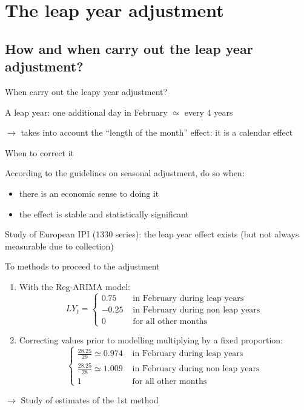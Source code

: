 \documentclass[10pt,xcolor=table,color={dvipsnames,usenames},ignorenonframetext,usepdftitle=false,french]{beamer}
\begin{document}
\section{The leap year adjustment}\label{the-leap-year-adjustment}

\subsection{How and when carry out the leap year
adjustment?}\label{how-and-when-carry-out-the-leap-year-adjustment}

\begin{frame}{When carry out the leapy year adjustment?}

A leap year: one additional day in February \(\simeq\) every 4 years

\(\rightarrow\) takes into account the ``length of the month'' effect:
it is a calendar effect

\medskip

When to correct it \bcquestion 

\medskip \pause

According to the guidelines on seasonal adjustment, do so when:

\begin{itemize}
\item
  there is an economic sense to doing it
\item
  the effect is stable and statistically significant
\end{itemize}

\medskip \pause
Study of European IPI (1330 series): the leap year effect exists (but
not always measurable due to collection)

\end{frame}

\begin{frame}{To methods to proceed to the adjustment}

\begin{enumerate}
\item<1-> With the Reg-ARIMA model:
\[
LY_t = \begin{cases}
0.75 & \text{ in February during leap years} \\
-0.25  & \text{ in February during non leap years} \\
0 & \text{ for all other months}
\end{cases}
\]
\item<2-> Correcting values prior to modelling multiplying by a fixed proportion: 
\[\begin{cases}
\frac{28.25}{29} \simeq 0.974 & \text{ in February during leap years} \\
\frac{28.25}{28} \simeq 1.009 & \text{ in February during non leap years} \\
1 & \text{ for all other months}
\end{cases}
\]
\end{enumerate}

\pause[3]

\pause[4]

\(\rightarrow\) Study of estimates of the 1st method

\end{frame}
\end{document}
